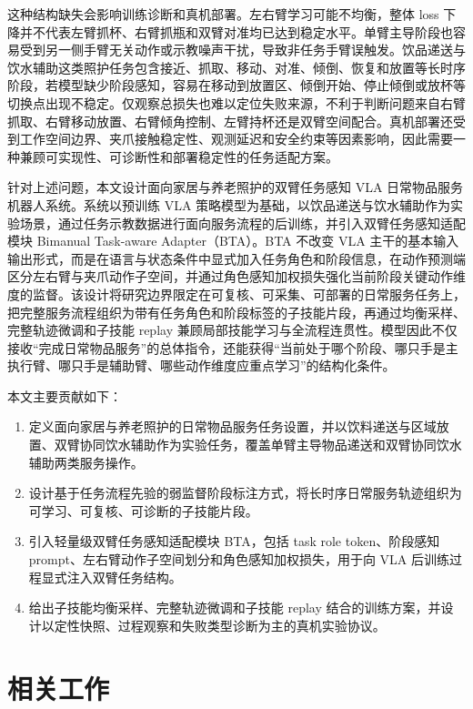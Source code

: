 \documentclass[UTF8,a4paper,zihao=5,scheme=chinese]{ctexart}
\numberwithin{figure}{section}
\numberwithin{table}{section}
\begin{document}
这种结构缺失会影响训练诊断和真机部署。左右臂学习可能不均衡，整体 loss 下降并不代表左臂抓杯、右臂抓瓶和双臂对准均已达到稳定水平。单臂主导阶段也容易受到另一侧手臂无关动作或示教噪声干扰，导致非任务手臂误触发。饮品递送与饮水辅助这类照护任务包含接近、抓取、移动、对准、倾倒、恢复和放置等长时序阶段，若模型缺少阶段感知，容易在移动到放置区、倾倒开始、停止倾倒或放杯等切换点出现不稳定。仅观察总损失也难以定位失败来源，不利于判断问题来自右臂抓取、右臂移动放置、右臂倾角控制、左臂持杯还是双臂空间配合。真机部署还受到工作空间边界、夹爪接触稳定性、观测延迟和安全约束等因素影响，因此需要一种兼顾可实现性、可诊断性和部署稳定性的任务适配方案。

针对上述问题，本文设计面向家居与养老照护的双臂任务感知 VLA 日常物品服务机器人系统。系统以预训练 VLA 策略模型为基础，以饮品递送与饮水辅助作为实验场景，通过任务示教数据进行面向服务流程的后训练，并引入双臂任务感知适配模块 Bimanual Task-aware Adapter（BTA）。BTA 不改变 VLA 主干的基本输入输出形式，而是在语言与状态条件中显式加入任务角色和阶段信息，在动作预测端区分左右臂与夹爪动作子空间，并通过角色感知加权损失强化当前阶段关键动作维度的监督。该设计将研究边界限定在可复核、可采集、可部署的日常服务任务上，把完整服务流程组织为带有任务角色和阶段标签的子技能片段，再通过均衡采样、完整轨迹微调和子技能 replay 兼顾局部技能学习与全流程连贯性。模型因此不仅接收“完成日常物品服务”的总体指令，还能获得“当前处于哪个阶段、哪只手是主执行臂、哪只手是辅助臂、哪些动作维度应重点学习”的结构化条件。

本文主要贡献如下：
\begin{enumerate}
  \item 定义面向家居与养老照护的日常物品服务任务设置，并以饮料递送与区域放置、双臂协同饮水辅助作为实验任务，覆盖单臂主导物品递送和双臂协同饮水辅助两类服务操作。
  \item 设计基于任务流程先验的弱监督阶段标注方式，将长时序日常服务轨迹组织为可学习、可复核、可诊断的子技能片段。
  \item 引入轻量级双臂任务感知适配模块 BTA，包括 task role token、阶段感知 prompt、左右臂动作子空间划分和角色感知加权损失，用于向 VLA 后训练过程显式注入双臂任务结构。
  \item 给出子技能均衡采样、完整轨迹微调和子技能 replay 结合的训练方案，并设计以定性快照、过程观察和失败类型诊断为主的真机实验协议。
\end{enumerate}

\clearpage
\section{相关工作}
\end{document}
